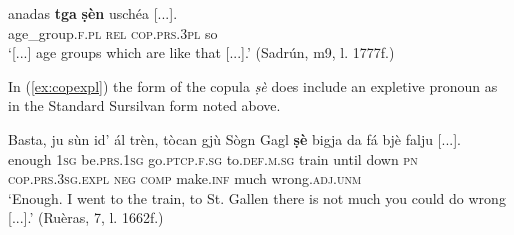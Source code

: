 \ea
\label{ex:se6}
\gll [...] anadas \textbf{tga} \textbf{ṣèn} uschéa [...].\\
{} age\_group.\textsc{f.pl} \textsc{rel} \textsc{cop.prs.3pl} so\\
\glt `[...] age groups which are like that [...].' (Sadrún, m9, l. 1777f.)
\z

In (\ref{ex:copexpl}) the form of the copula \textit{ṣè} does include an expletive pronoun as in the Standard Sursilvan form noted above. 

\ea
\label{ex:copexpl}
\gll Basta, ju sùn id’ ál trèn, tòcan gjù Sògn Gagl \textbf{ṣè} bigja da fá bjè falju [...].   \\
enough \textsc{1sg} be.\textsc{prs.1sg} go.\textsc{ptcp.f.sg} to.\textsc{def.m.sg} train until down \textsc{pn} {} \textsc{cop.prs.3sg.expl} \textsc{neg} \textsc{comp} make.\textsc{inf} much wrong.\textsc{adj.unm}\\
\glt `Enough. I went to the train, to St. Gallen there is not much you could do wrong [...].' (Ruèras, 7, l. 1662f.)
\z

